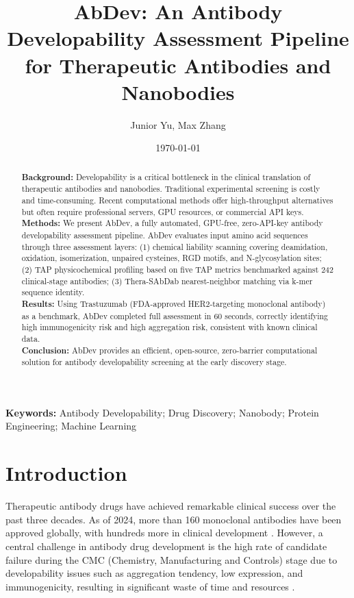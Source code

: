 \documentclass[12pt,a4paper]{article}
\title{\textbf{AbDev: An Antibody Developability Assessment Pipeline for Therapeutic Antibodies and Nanobodies}}
\author{Junior Yu, Max Zhang}
\date{\today}
\begin{document}
\maketitle

\begin{abstract}
\textbf{Background:} Developability is a critical bottleneck in the clinical translation of therapeutic antibodies and nanobodies. Traditional experimental screening is costly and time-consuming. Recent computational methods offer high-throughput alternatives but often require professional servers, GPU resources, or commercial API keys.\\[3pt]
\textbf{Methods:} We present AbDev, a fully automated, GPU-free, zero-API-key antibody developability assessment pipeline. AbDev evaluates input amino acid sequences through three assessment layers: (1) chemical liability scanning covering deamidation, oxidation, isomerization, unpaired cysteines, RGD motifs, and N-glycosylation sites; (2) TAP physicochemical profiling based on five TAP metrics \citep{Raybould2019} benchmarked against 242 clinical-stage antibodies; (3) Thera-SAbDab nearest-neighbor matching via k-mer sequence identity.\\[3pt]
\textbf{Results:} Using Trastuzumab (FDA-approved HER2-targeting monoclonal antibody) as a benchmark, AbDev completed full assessment in 60 seconds, correctly identifying high immunogenicity risk and high aggregation risk, consistent with known clinical data.\\[3pt]
\textbf{Conclusion:} AbDev provides an efficient, open-source, zero-barrier computational solution for antibody developability screening at the early discovery stage.
\end{abstract}

\bigskip
\noindent\textbf{Keywords:} Antibody Developability; Drug Discovery; Nanobody; Protein Engineering; Machine Learning

\newpage

\section{Introduction}

Therapeutic antibody drugs have achieved remarkable clinical success over the past three decades. As of 2024, more than 160 monoclonal antibodies have been approved globally, with hundreds more in clinical development \citep{Beck2018}. However, a central challenge in antibody drug development is the high rate of candidate failure during the CMC (Chemistry, Manufacturing and Controls) stage due to developability issues such as aggregation tendency, low expression, and immunogenicity, resulting in significant waste of time and resources \citep{Joubert2020}.
\end{document}
